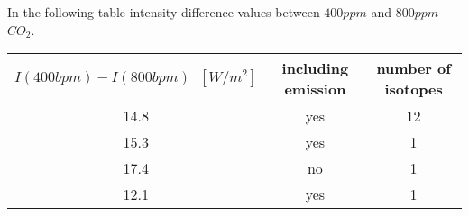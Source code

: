 

In the following table intensity difference values between $400 ppm$ and $800 ppm$ $CO_2$. 
\newline
\newline
\begin{tabular}{|c |c |c |}
	\hline
	$I(400 bpm) - I(800 bpm) \;\; [W/m^2]$ & including emission & number of isotopes \\
	\hline
	14.8                                     & yes      &  12         \\
	15.3                                     & yes      &  1          \\
	17.4                                     & no       &  1          \\
	12.1                                     & yes      &  1       \\
	\hline   
\end{tabular}  
